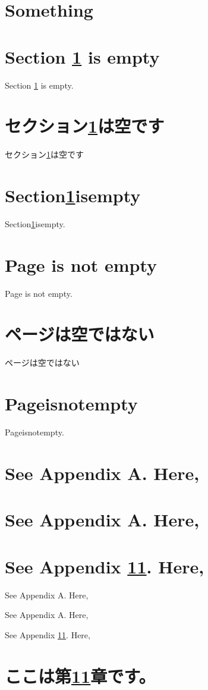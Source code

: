\documentclass[twocolumn]{jarticle}
\begin{document}

\tableofcontents\newpage
\section{Something}\label{a}
\section{Section \ref{a} is empty}
Section \ref{a} is empty.
\section{セクション\ref{a}は空です}
セクション\ref{a}は空です
\section{Section\ref{a}isempty}
Section\ref{a}isempty.
\section{Page \pageref{a} is not empty}
Page \pageref{a} is not empty.
\section{ページ\pageref{a}は空ではない}
ページ\pageref{a}は空ではない
\section{Page\pageref{a}isnotempty}
Page\pageref{a}isnotempty.

\setcounter{section}{10}
\section{See Appendix A. Here,}
\section{See Appendix A\@. Here,}
\section{See Appendix \ref{testA}. Here,}
See Appendix A. Here,\par
See Appendix A\@. Here,\par
See Appendix \ref{testA}. Here,\par
\appendix
\section{ここは第\ref{testA}章です。}\label{testA}
\end{document}
